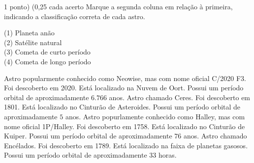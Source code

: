 \documentclass{../lista}
\begin{document}
	\begin{questao}{1 ponto) (0,25 cada acerto}
		Marque a segunda coluna em relação à primeira, indicando a classificação correta de cada astro.
		\begin{multicols}{2}
			\vfill\null \vfill\null
			\begin{flushleft}
				(1) Planeta anão \\
				(2) Satélite natural \\
				(3) Cometa de curto período \\
				(4) Cometa de longo período
			\end{flushleft}
			\vfill\null \vfill\null
			\columnbreak

			\begin{alternativas}
				\alternativaMarcada[$\red{4}$] Astro popularmente conhecido como Neowise, mas com nome oficial C/2020 F3. Foi descoberto em 2020. Está localizado na Nuvem de Oort. Possui um período orbital de aproximadamente $6.766$ anos.
				\alternativaMarcada[$\red{1}$] Astro chamado Ceres. Foi descoberto em 1801. Está localizado no Cinturão de Asteroides. Possui um período orbital de aproximadamente $5$ anos.
				\alternativaMarcada[$\red{3}$] Astro popurlamente conhecido como Halley, mas com nome oficial 1P/Halley. Foi descoberto em 1758. Está localizado no Cinturão de Kuiper. Possui um período orbital de aproximadamente $76$ anos.
				\alternativaMarcada[$\red{2}$] Astro chamado Encélados. Foi descoberto em 1789. Está localizado na faixa de planetas gasosos. Possui um período orbital de aproximadamente 33 horas.
			\end{alternativas}
		\end{multicols}
	\end{questao}
\end{document}
